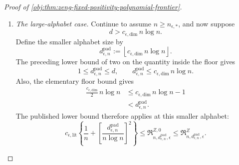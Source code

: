 \begin{proof}[Proof of \cref{obj:thm:zeng-fixed-positivity-polynomial-frontier}]
\begin{enumerate}
First suppose \(n\ge n_{\epsilon,*}\). Then
\[
n\ge n_{\epsilon,\mathrm{lit}},
\qquad
n\ge3,
\qquad
\log n>1,
\qquad
n\log n>0.
\]
Furthermore, the choice of \(n_{\epsilon,1}\) gives
\[
2\le c_{\epsilon,\mathrm{dim}}\,n
\le c_{\epsilon,\mathrm{dim}}\,n\log n.
\]
If
\[
d\le c_{\epsilon,\mathrm{dim}}\,n\log n,
\]
the published bound and subclass inclusion imply
\[
c_{\epsilon,\mathrm{lit}}
\left\{
\frac1n+\left[\frac d{n\log n}\right]^2
\right\}
\le
\mathfrak R^{Z,0}_{n,d,\epsilon}
\le
\mathfrak R^Z_{n,d,\epsilon}.
\]
Since
\[
0<\log n\le\log(e+n),
\qquad
0\le\frac d{n\log(e+n)}
\le\frac d{n\log n},
\]
we have
\[
r^{\mathrm{fix}}_{n,d}
\le
\frac1n+\left[\frac d{n\log(e+n)}\right]^2
\le
\frac1n+\left[\frac d{n\log n}\right]^2.
\]
Using \(c_\epsilon\le c_{\epsilon,\mathrm{lit}}\) gives
\[
\begin{split}
c_\epsilon r^{\mathrm{fix}}_{n,d}
&\le
c_\epsilon
\left\{
\frac1n+\left[\frac d{n\log n}\right]^2
\right\}\\
&\le
c_{\epsilon,\mathrm{lit}}
\left\{
\frac1n+\left[\frac d{n\log n}\right]^2
\right\}
\le
\mathfrak R^Z_{n,d,\epsilon}.
\end{split}
\]

\item \textit{The large-alphabet case.}
Continue to assume \(n\ge n_{\epsilon,*}\), and now suppose
\[
d>c_{\epsilon,\mathrm{dim}}\,n\log n.
\]
Define the smaller alphabet size by
\[
d_{\epsilon,n}^{\mathrm{pad}}
:=
\left\lfloor c_{\epsilon,\mathrm{dim}}\,n\log n\right\rfloor.
\]
The preceding lower bound of two on the quantity inside the floor gives
\[
1\le d_{\epsilon,n}^{\mathrm{pad}}\le d,
\qquad
d_{\epsilon,n}^{\mathrm{pad}}
\le c_{\epsilon,\mathrm{dim}}\,n\log n.
\]
Also, the elementary floor bound gives
\[
\begin{split}
\frac{c_{\epsilon,\mathrm{dim}}}{2}\,n\log n
&\le c_{\epsilon,\mathrm{dim}}\,n\log n-1\\
&<d_{\epsilon,n}^{\mathrm{pad}}.
\end{split}
\]
The published lower bound therefore applies at this smaller alphabet:
\[
c_{\epsilon,\mathrm{lit}}
\left\{
\frac1n+
\left[
\frac{d_{\epsilon,n}^{\mathrm{pad}}}{n\log n}
\right]^2
\right\}
\le
\mathfrak R^{Z,0}_{n,d_{\epsilon,n}^{\mathrm{pad}},\epsilon}
\le
\mathfrak R^Z_{n,d_{\epsilon,n}^{\mathrm{pad}},\epsilon}.
\]


\end{enumerate}
\end{proof}
